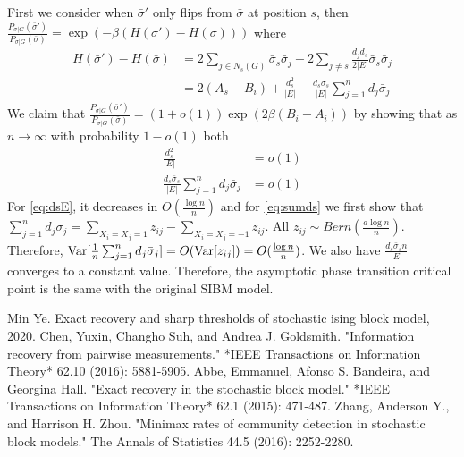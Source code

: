 \documentclass{article}
\begin{document}
First we consider when $\bar{\sigma}'$ only flips from $\bar{\sigma}$ at position $s$, then
$\frac{P_{\sigma | G}(\bar{\sigma}')}{P_{\sigma |G}(\bar{\sigma})} = \exp(-\beta(H(\bar{\sigma}')-H(\bar{\sigma})))$
where
\begin{align*}
H(\bar{\sigma}')-H(\bar{\sigma}) &= 2\sum_{j\in N_s(G)} \bar{\sigma}_s \bar{\sigma}_j - 2\sum_{j\neq s}\frac{d_jd_s}{2|E|} \bar{\sigma}_s \bar{\sigma}_j  \\
&=2(A_s - B_i) + \frac{d_s^2}{|E|} - \frac{d_s\bar{\sigma}_s}{|E|}\sum_{j=1}^n d_j \bar{\sigma}_j
\end{align*}
We claim that $\frac{P_{\sigma | G}(\bar{\sigma}')}{P_{\sigma |G}(\bar{\sigma})} =(1+o(1))\exp(2\beta(B_i - A_i))$
by showing that as $n\to \infty$ with probability $1-o(1)$ both 
\begin{align}
\frac{d_s^2}{|E|} &= o(1) \label{eq:dsE}\\
\frac{d_s\bar{\sigma}_s}{|E|}\sum_{j=1}^n d_j \bar{\sigma}_j  &= o(1) \label{eq:sumds}
\end{align}
For \eqref{eq:dsE}, it decreases in $O(\frac{\log n}{n})$ and for 
\eqref{eq:sumds} we first show that
$\sum_{j=1}^n d_j \bar{\sigma}_j  = \sum_{X_i=X_j=1} z_{ij} - \sum_{X_i=X_j=-1} z_{ij}$.
All $z_{ij} \sim Bern(\frac{a\log n}{n})$. Therefore,
$\operatorname{Var}[\frac{1}{n}\sum_{j=1}^n d_j \bar{\sigma}_j] = O(\operatorname{Var}[z_{ij}]) = O(\frac{ \log n}{n})$.
We also have $\frac{d_s \bar{\sigma}_s n}{|E|}$ converges to a constant value.
Therefore, the asymptotic phase transition critical point is the same with the original SIBM model.
\begin{thebibliography}{1}
	

	Min Ye.
	\newblock Exact recovery and sharp thresholds of stochastic ising block model,
	2020.
	Chen, Yuxin, Changho Suh, and Andrea J. Goldsmith. "Information recovery from pairwise measurements." *IEEE Transactions on Information Theory* 62.10 (2016): 5881-5905.
	Abbe, Emmanuel, Afonso S. Bandeira, and Georgina Hall. "Exact recovery in the stochastic block model." *IEEE Transactions on Information Theory* 62.1 (2015): 471-487.
	Zhang, Anderson Y., and Harrison H. Zhou. "Minimax rates of community detection in stochastic block models." The Annals of Statistics 44.5 (2016): 2252-2280.
\end{thebibliography}
\end{document}
